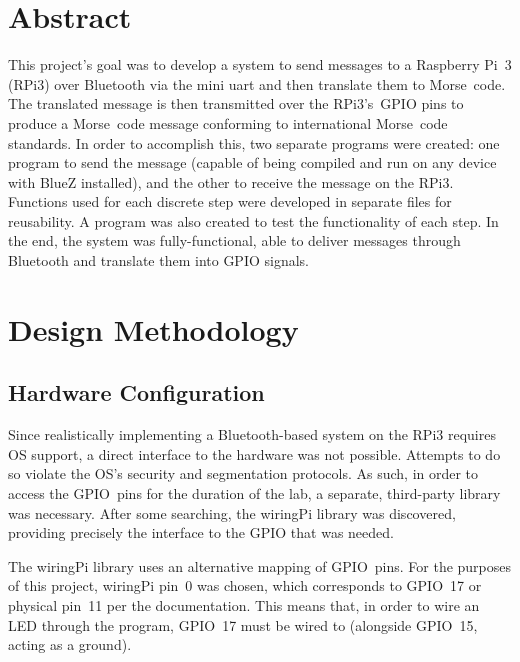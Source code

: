 \documentclass[11pt]{article}
\begin{document}


\section{Abstract}
\label{sec:abstract}


This project's goal was to develop a system to send messages to a Raspberry Pi~3 (RPi3) over Bluetooth via the mini uart and then translate them to Morse~code.
The translated message is then transmitted over the RPi3's~GPIO pins to produce a Morse~code message conforming to international Morse~code standards.
In order to accomplish this, two separate programs were created: one program to send the message (capable of being compiled and run on any device with BlueZ installed), and the other to receive the message on the RPi3.
Functions used for each discrete step were developed in separate files for reusability.
A program was also created to test the functionality of each step.
In the end, the system was fully-functional, able to deliver messages through Bluetooth and translate them into GPIO signals.


\section{Design Methodology}
\label{sec:design_methodology}


\subsection{Hardware Configuration}
\label{sub:hardware_configuration}


Since realistically implementing a Bluetooth-based system on the RPi3 requires OS support, a direct interface to the hardware was not possible.
Attempts to do so violate the OS's security and segmentation protocols.
As such, in order to access the GPIO~pins for the duration of the lab, a separate, third-party library was necessary.
After some searching, the wiringPi library was discovered, providing precisely the interface to the GPIO that was needed.


The wiringPi library uses an alternative mapping of GPIO~pins.
For the purposes of this project, wiringPi pin~0 was chosen, which corresponds to GPIO~17 or physical pin~11 per the documentation.
This means that, in order to wire an LED through the program, GPIO~17 must be wired to (alongside GPIO~15, acting as a ground).
\end{document}
